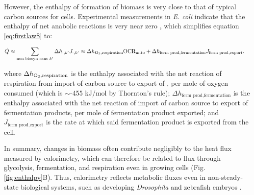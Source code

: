 \documentclass{compactarticle}
\begin{document}
However, the enthalpy of formation of biomass is very close to that of typical carbon sources for cells. Experimental measurements in \textit{E. coli} indicate that the enthalpy of net anabolic reactions is very near zero \cite{battley_enthalpy_1992}, which simplifies equation \ref{eq:firstlaw8} to:

\begin{align}
    \begin{split}
        \dot{Q} &\approx \sum_{\text{non-biosyn rxns }k'}  \Delta h_{\cdot,k'} J_{\cdot,k'} \approx \Delta h_{\ce{O2},\text{respiration}} \text{OCR}_\text{mito} + \Delta h_{\text{ferm prod,fermentation}} J_{\text{ferm prod,export}}.
        \label{eq:firstlaw9}
    \end{split}
\end{align}

\noindent where $\Delta h_{\ce{O2},\text{respiration}} $ is the enthalpy associated with the net reaction of respiration from import of carbon source to export of , per mole of oxygen consumed (which is $\sim$-455 kJ/mol  by Thornton's rule); $ \Delta h_{\text{ferm prod,fermentation}} $ is the enthalpy associated with the net reaction of import of carbon source to export of fermentation products, per mole of fermentation product exported; and $ J_{\text{ferm prod,export}} $ is the rate at which said fermentation product is exported from the cell.

In summary, changes in biomass often contribute negligibly to the heat flux measured by calorimetry, which can therefore be related to flux through glycolysis, fermentation, and respiration even in growing cells (Fig. \ref{fig:enthalpy}B). Thus, calorimetry reflects metabolic fluxes even in non-steady-state biological systems, such as developing \textit{Drosophila} and zebrafish embryos \cite{song_energy_2019,rodenfels_contribution_2020}.
\end{document}
